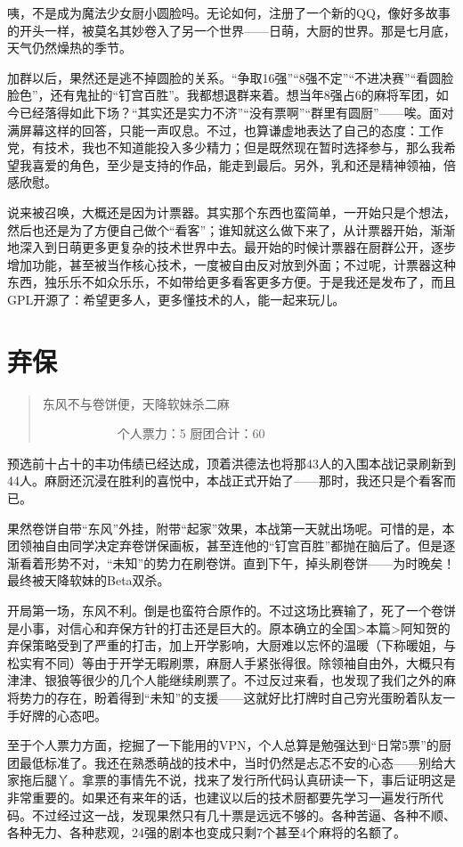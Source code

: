 咦，不是成为魔法少女厨小圆脸吗。无论如何，注册了一个新的QQ，像好多故事的开头一样，被莫名其妙卷入了另一个世界——日萌，大厨的世界。那是七月底，天气仍然燥热的季节。

加群以后，果然还是逃不掉圆脸的关系。“争取16强”“8强不定”“不进决赛”“看圆脸脸色”，还有鬼扯的“钉宫百胜”。我都想退群来着。想当年8强占6的麻将军团，如今已经落得如此下场？“其实还是实力不济”“没有票啊”“群里有圆厨”——唉。面对满屏幕这样的回答，只能一声叹息。不过，也算谦虚地表达了自己的态度：工作党，有技术，我也不知道能投入多少精力；但是既然现在暂时选择参与，那么我希望我喜爱的角色，至少是支持的作品，能走到最后。另外，乳和还是精神领袖，倍感欣慰。

说来被召唤，大概还是因为计票器。其实那个东西也蛮简单，一开始只是个想法，然后也还是为了方便自己做个“看客”；谁知就这么做下来了，从计票器开始，渐渐地深入到日萌更多更复杂的技术世界中去。最开始的时候计票器在厨群公开，逐步增加功能，甚至被当作核心技术，一度被自由反对放到外面；不过呢，计票器这种东西，独乐乐不如众乐乐，不如带给更多看客更多方便。于是我还是发布了，而且GPL开源了：希望更多人，更多懂技术的人，能一起来玩儿。


\chapter{弃保}
\begin{quote}
东风不与卷饼便，天降软妹杀二麻

　　　　　　个人票力：5 厨团合计：60
\end{quote}

预选前十占十的丰功伟绩已经达成，顶着洪德法也将那43人的入围本战记录刷新到44人。麻厨还沉浸在胜利的喜悦中，本战正式开始了——那时，我还只是个看客而已。

果然卷饼自带“东风”外挂，附带“起家”效果，本战第一天就出场呢。可惜的是，本团领袖自由同学决定弃卷饼保画板，甚至连他的“钉宫百胜”都抛在脑后了。但是逐渐看着形势不对，“未知”的势力在刷卷饼。直到下午，掉头刷卷饼——为时晚矣！最终被天降软妹的Beta双杀。

开局第一场，东风不利。倒是也蛮符合原作的。不过这场比赛输了，死了一个卷饼是小事，对信心和弃保方针的打击还是巨大的。原本确立的全国>本篇>阿知贺的弃保策略受到了严重的打击，加上开学影响，大厨难以忘怀的温暖（下称暖姐，与松实宥不同）等由于开学无暇刷票，麻厨人手紧张得很。除领袖自由外，大概只有津津、银狼等很少的几个人能继续刷票了。不过反过来看，也发现了我们之外的麻将势力的存在，盼着得到“未知”的支援——这就好比打牌时自己穷光蛋盼着队友一手好牌的心态吧。

至于个人票力方面，挖掘了一下能用的VPN，个人总算是勉强达到“日常5票”的厨团最低标准了。我还在熟悉萌战的技术中，当时仍然是忐忑不安的心态——别给大家拖后腿丫。拿票的事情先不说，找来了发行所代码认真研读一下，事后证明这是非常重要的。如果还有来年的话，也建议以后的技术厨都要先学习一遍发行所代码。不过经过这一战，发现果然只有几十票是远远不够的。各种苦逼、各种不顺、各种无力、各种悲观，24强的剧本也变成只剩7个甚至4个麻将的名额了。


